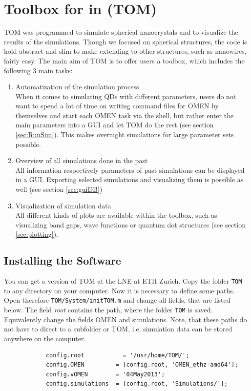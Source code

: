 \chapter{Toolbox for \omen in \matlab (TOM)}

	\gls{TOM} was programmed to simulate spherical nanocrystals and to visualize the results of the simulations.
	Though we focused on spherical structures, the code is hold abstract and slim to make extending to other
	structures, such as nanowires, fairly easy.
	The main aim of \gls{TOM} is to offer \omen users a toolbox, which includes the following 3 main tasks:
	\begin{enumerate}
		\itemsep 0pt
		\item Automatization of the \omen simulation process \\
					When it comes to simulating \glspl{QD} with different parameters, users do not want to spend a lot
					of time on writing command files for OMEN by themselves and start each OMEN task via the shell, but 
					rather enter the main parameters into a \gls{GUI} and let \gls{TOM} do the rest (see section \ref{sec:RunSim}).
					This makes overnight simulations for large parameter sets possible.
		\item Overview of all simulations done in the past	\\
					All information respectively parameters of past simulations can be displayed in a \gls{GUI}. Exporting selected
					simulations and visualizing them is possible as well (see section \ref{sec:guiDB})
		\item Visualization of simulation data	\\
					All different kinds of plots are available within the toolbox, such as visualizing band gaps, wave functions or
					quantum dot structures (see section \ref{sec:plotting}).
	\end{enumerate}

	\section{Installing the Software}
		You can get a version of \gls{TOM} at the \gls{LNE} at {\sc ETH} Zurich. Copy the folder \lstinline{TOM} to any directory on your computer.
		Now it is necessary to define some paths. Open therefore \lstinline{TOM/System/initTOM.m} and change all fields, that are listed below.
		The field {\it root} contains the path, where the folder \lstinline{TOM} is saved. Equivalently change the fields OMEN and simulations. Note,
		that these paths do not have to direct to a subfolder or TOM, i.e. simulation data can be stored anywhere on the computer.
		\begin{lstlisting}
			config.root     	  = '/usr/home/TOM/';
			config.OMEN         = [config.root, 'OMEN_ethz-amd64'];
			config.vOMEN        = '04May2013';
			config.simulations  = [config.root, 'Simulations/'];
		\end{lstlisting}

